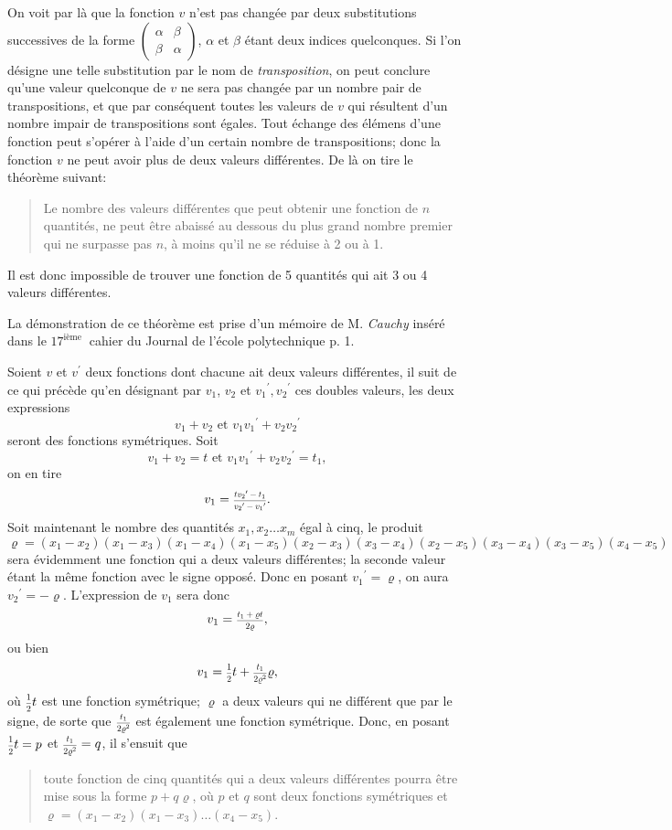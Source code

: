 \documentclass[oneside, 12 pt, leqno]{memoir}
\let\oldfrac\frac
\def\frac#1#2{\mathchoice{\text{\scalebox{.83}{${\oldfrac{#1}{#2}}$}}}{\text{\scalebox{.83}{${\displaystyle\oldfrac{#1}{#2}}$}}}{\genfrac{}{}{}{2}{#1}{#2}}{\genfrac{}{}{}{3}{#1}{#2}}}
\begin{document}
On voit par là que la fonction \(v\) n'est pas changée par deux substitutions successives de la forme \(\left(\begin{array}{cc}\alpha & \beta \\ \beta & \alpha\end{array}\right)\), \(\alpha\) et \(\beta\) étant deux indices quelconques. Si l'on désigne une telle substitution par le nom de \textit{transposition}, on peut conclure qu'une valeur quelconque de \(v\) ne sera pas changée par un nombre pair de transpositions, et que par conséquent toutes les valeurs de \(v\) qui résultent d'un nombre impair de transpositions sont égales. Tout échange des élémens d'une fonction peut s'opérer à l'aide d'un certain nombre de transpositions; donc la fonction \(v\) ne peut avoir plus de deux valeurs différentes. De là on tire le théorème suivant:
\begin{quote} Le nombre des valeurs différentes que peut obtenir une fonction de \(n\) quantités, ne peut être abaissé au dessous du plus grand nombre premier qui ne surpasse pas \(n\), à moins qu'il ne se réduise à 2 ou à 1. \end{quote}

Il est donc impossible de trouver une fonction de 5 quantités qui ait 3 ou 4 valeurs différentes.

La démonstration de ce théorème est prise d'un mémoire de M. \textit{Cauchy} inséré dans le \(17^{\text {ième }}\) cahier du Journal de l'école polytechnique p. 1.

Soient \(v\) et \(v^{\prime}\) deux fonctions dont chacune ait deux valeurs différentes, il suit de ce qui précède qu'en désignant par \(v_1\), \(v_2\) et \({v_1}^{\prime}, {v_2}^{\prime}\) ces doubles valeurs, les deux expressions
\[v_1+v_2 \text { et } v_1 {v_1}^{\prime}+v_2 {v_2}^{\prime}\]
seront des fonctions symétriques. Soit
\[v_1+v_2=t \text { et } v_1 {v_1}^{\prime}+v_2 {v_2}^{\prime}=t_1,\]
on en tire
\[v_1=\frac{t {v_2}^{\prime}-t_1}{{v_2}^{\prime}-{v_1}^{\prime}}.\]
Soit maintenant le nombre des quantités \(x_1, x_2 \dots x_m\) égal à cinq, le produit
\[\varrho=(x_1-x_2)(x_1-x_3)(x_1-x_4)(x_1-x_5)(x_2-x_3)(x_3-x_4)(x_2-x_5)(x_3-x_4)(x_3-x_5)(x_4-x_5)\]
sera évidemment une fonction qui a deux valeurs différentes; la seconde valeur étant la même fonction avec le signe opposé. Donc en posant \({v_1}^{\prime}=\varrho\), on aura \({v_2}^{\prime}=-\varrho\). L'expression de \(v_1\) sera donc
\[v_1=\frac{t_1+\varrho t}{2 \varrho},\]
ou bien
\[v_1=\frac{1}{2} t+\frac{t_1}{2 \varrho^2} \varrho,\]
où \(\frac{1}{2} t\) est une fonction symétrique; \(\varrho\) a deux valeurs qui ne différent que par le signe, de sorte que \(\frac{t_1}{2 \varrho^2}\) est également une fonction symétrique.
Donc, en posant \(\frac{1}{2} t=p\) et \(\frac{t_1}{2 \varrho^2}=q\), il s'ensuit que 
\begin{quote}toute fonction de cinq quantités qui a deux valeurs différentes pourra être mise sous la forme \(p+q \varrho\), où \(p\) et \(q\) sont deux fonctions symétriques et \(\varrho=\left(x_1-x_2\right)\left(x_1-x_3\right) \dots\left(x_4-x_5\right)\).\end{quote}
\end{document}
